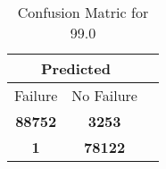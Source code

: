 \begin{table}[] 
\caption{Confusion Matric for 99.0} 
\label{Table: Prediction Accuracy-DMD99.0OnlySunEKF-combinationReflectionEKF-top2-Reflection} 
\centering 
\begin{tabular} 
 {@{}ccc@{}} 
\toprule 
\multicolumn{2}{c}{\textbf{Predicted}}
 \\ \midrule 
\multicolumn{1}{|c|}{Failure} & 
\multicolumn{1}{c|}{No Failure}
 \\ \midrule 
\multicolumn{1}{|c|}{\color{green}\textbf{88752}} & 
\multicolumn{1}{c|}{\color{red}\textbf{3253}}
 \\ \midrule 
\multicolumn{1}{|c|}{\color{red}\textbf{1}} & 
\multicolumn{1}{c|}{\color{green}\textbf{78122}}
 \\ \bottomrule 
\end{tabular} 
\end{table} 
